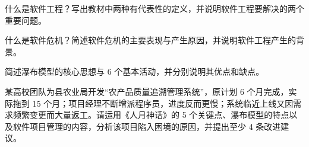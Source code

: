 \documentclass[a4paper,11pt]{article}
\begin{document}
\q 什么是软件工程？写出教材中两种有代表性的定义，并说明软件工程要解决的两个重要问题。\anslines{2.4cm}

\q 什么是软件危机？简述软件危机的主要表现与产生原因，并说明软件工程产生的背景。\anslines{2.4cm}

\q 简述瀑布模型的核心思想与 6 个基本活动，并分别说明其优点和缺点。\anslines{2.4cm}

\newpage
{}
\q 某高校团队为县农业局开发“农产品质量追溯管理系统”，原计划 6 个月完成，实际拖到 15 个月；项目经理不断增派程序员，进度反而更慢；系统临近上线又因需求频繁变更而大量返工。请运用《人月神话》的 5 个关键点、瀑布模型的特点以及软件项目管理的内容，分析该项目陷入困境的原因，并提出至少 4 条改进建议。\anslines{5cm}
\end{document}
